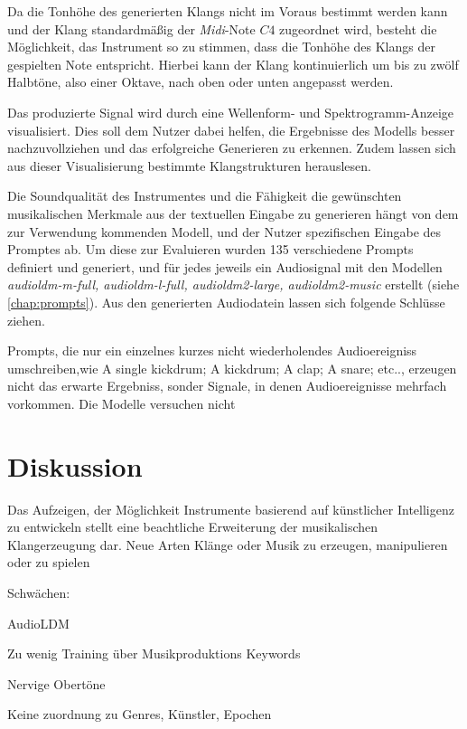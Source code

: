 \documentclass[
  a4paper,  %
  twoside,  %
  bibliography=totoc,
  headsepline,
  cleardoublepage=empty,
  parskip=half,
  draft=false
]{scrbook}
\begin{document}
Da die Tonhöhe des generierten Klangs nicht im Voraus bestimmt werden kann und der Klang standardmäßig der \emph{Midi}-Note $C4$ zugeordnet wird, besteht die Möglichkeit, das Instrument so zu stimmen, dass die Tonhöhe des Klangs der gespielten Note entspricht. Hierbei kann der Klang kontinuierlich um bis zu zwölf Halbtöne, also einer Oktave, nach oben oder unten angepasst werden.

Das produzierte Signal wird durch eine Wellenform- und Spektrogramm-Anzeige visualisiert. Dies soll dem Nutzer dabei helfen, die Ergebnisse des Modells besser nachzuvollziehen und das erfolgreiche Generieren zu erkennen. Zudem lassen sich aus dieser Visualisierung bestimmte Klangstrukturen herauslesen.

Die Soundqualität des Instrumentes und die Fähigkeit die gewünschten musikalischen Merkmale aus der textuellen Eingabe zu generieren hängt von dem zur Verwendung kommenden Modell, und der Nutzer spezifischen Eingabe des Promptes ab. Um diese zur Evaluieren wurden 135 verschiedene Prompts definiert und generiert, und für jedes jeweils ein Audiosignal mit den Modellen \emph{audioldm-m-full, audioldm-l-full, audioldm2-large, audioldm2-music} erstellt \cite{liu_audioldm_2023,liu_audioldm2_2023}(siehe \ref{chap:prompts}). Aus den generierten Audiodatein lassen sich folgende Schlüsse ziehen. 

Prompts, die nur ein einzelnes kurzes nicht wiederholendes Audioereigniss umschreiben,wie \glqq A single kickdrum\grqq; 
\glqq A kickdrum\grqq; \glqq A clap\grqq; \glqq A snare\grqq; etc.., erzeugen nicht das erwarte Ergebniss, sonder Signale, in denen Audioereignisse mehrfach vorkommen. Die Modelle versuchen nicht 

\chapter{Diskussion}

Das Aufzeigen, der Möglichkeit Instrumente basierend auf künstlicher Intelligenz zu entwickeln stellt eine beachtliche Erweiterung der musikalischen Klangerzeugung dar. Neue Arten Klänge oder Musik zu erzeugen, manipulieren oder zu spielen  


Schwächen:

AudioLDM

Zu wenig Training über Musikproduktions Keywords

Nervige Obertöne

Keine zuordnung zu Genres, Künstler, Epochen
\end{document}
